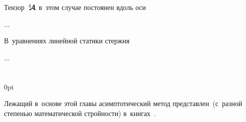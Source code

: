 
\begin{otherlanguage}{russian}

Тензор~${\hspace{.08ex}{^4\hspace{-0.72ex}\bm{\mathcal{A}}}\hspace{.08ex}}$ в~этом случае постоянен вдоль оси

...



\end{otherlanguage}



\begin{otherlanguage}{russian}

В~уравнениях линейной статики стержня

...




\end{otherlanguage}

\section*{\small \wordforbibliography}

\begin{changemargin}{\parindent}{0pt}
\fontsize{10}{12}\selectfont

\begin{otherlanguage}{russian}

Лежащий в~основе этой главы асимптотический метод представлен~(с~разной степенью математической стройности) в~книгах~\cite{bakhvalov.panasenko, asymptoticanalysisforperiodicstructures, kravchuk.mayboroda.urzhumtsev-polymericandcompositematerials, pobedrya-composites}.

\end{otherlanguage}

\end{changemargin}
